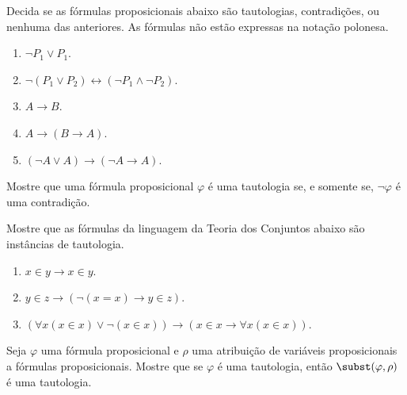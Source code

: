 \begin{exercise}
Decida se as fórmulas proposicionais abaixo são tautologias, contradições, ou nenhuma das anteriores.
As fórmulas não estão expressas na notação polonesa.

\begin{enumerate}[label=(\alph*)]
    \item $\neg P_1 \vee P_1$.
    \item $\neg (P_1 \vee P_2) \leftrightarrow (\neg P_1 \wedge \neg P_2)$.
    \item $A\rightarrow B$.
    \item $A\rightarrow (B\rightarrow A)$.
    \item $(\neg A\vee A)\rightarrow (\neg A\rightarrow A)$.
\end{enumerate}
\end{exercise}

\begin{exercise}
    Mostre que uma fórmula proposicional $\varphi$ é uma tautologia se, e somente se, $\neg \varphi$ é uma contradição.
\end{exercise}

\begin{exercise}
Mostre que as fórmulas da linguagem da Teoria dos Conjuntos abaixo são instâncias de tautologia.
\begin{enumerate}[label=(\alph*)]
    \item $x \in y \rightarrow x \in y$.
    \item $y \in z \rightarrow (\neg (x = x) \rightarrow y \in z)$.
    \item $(\forall x(x \in x) \vee \neg (x \in x))\rightarrow (x\in x \rightarrow \forall x(x \in x))$.
\end{enumerate}
\end{exercise}

\begin{exercise}
Seja $\varphi$ uma fórmula proposicional e $\rho$ uma atribuição de variáveis proposicionais a fórmulas proposicionais.
Mostre que se $\varphi$ é uma tautologia, então $\subst(\varphi, \rho)$ é uma tautologia.
\end{exercise}

